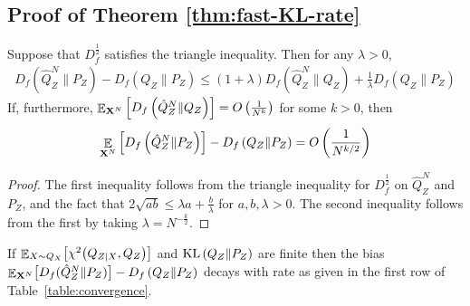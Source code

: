 \subsection{Proof of Theorem \ref{thm:fast-KL-rate}}\label{appendix:subsec:thm1}

\begin{lemma}\label{lemma:hilbertian-triangle}
Suppose that $D_f^{\frac{1}{2}}$ satisfies the triangle inequality.
Then for any $\lambda>0$,
\begin{align*}
    D_f\left(\hat{Q}^N_Z \| P_Z\right) - D_f\left(Q_{Z} \| P_Z\right) \leq (1+\lambda) D_f\left(\hat{Q}^N_Z \| Q_Z \right) +  \frac{1}{\lambda} D_f\left(Q_{Z} \| P_Z \right)
\end{align*}
If, furthermore, $\mathop{\mathbb{E}}_{\mathbf{X}^N}\left[ D_f\left(\hat{Q}^N_Z \| Q_Z\right)\right] = O\left( \frac{1}{N^k} \right)$ 
for some $k>0$, 
then
\begin{align*}
    \mathop{\mathbb{E}}_{\mathbf{X}^N}\left[ D_f\left(\hat{Q}^N_Z \| P_Z\right) \right] - D_f\left(Q_{Z} \| P_Z\right) = O\left( \frac{1}{N^{k/2}} \right)
\end{align*}
\end{lemma}
\begin{proof}
The first inequality follows from the triangle inequality for $D_f^{\frac{1}{2}}$ on $\hat{Q}^N_Z$ and $P_Z$, and the fact that $2\sqrt{ab} \leq \lambda a + \frac{b}{\lambda}$ for ${a, b, \lambda>0}$.
The second inequality follows from the first by taking $\lambda = N^{-\frac{k}{2}}$.
\end{proof}


\setcounter{theorem}{0}
\begin{theorem}
If
$\mathop{\mathbb{E}}_{X\sim Q_X}\bigl[\chi^2\bigl(Q_{Z|X}, Q_Z\bigr)\bigr]$ and
$\mathrm{KL}\left( Q_{Z} \| P_Z\right)$ are finite then the bias ${\mathop{\mathbb{E}}_{\mathbf{X}^N}\bigl[D_f( \hat{Q}_Z^N \| P_Z)\bigr] - D_f\left( Q_{Z} \| P_Z\right)}$ decays with rate as given in the first row of Table~\ref{table:convergence}.
\end{theorem}

